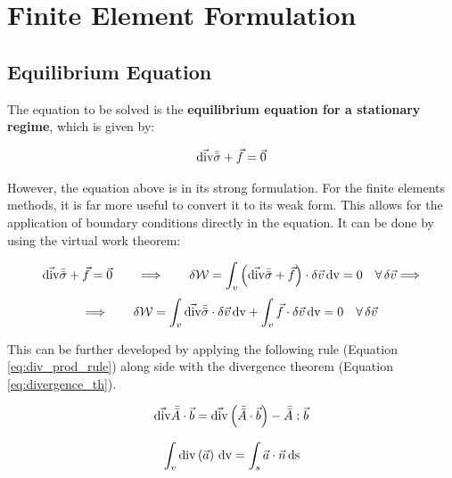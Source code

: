 \chapter{Finite Element Formulation}

\section{Equilibrium Equation}

The equation to be solved is the \textbf{equilibrium equation for a stationary regime}, which is given by:

\begin{equation}
    \vec{\mathrm{div}} \bar{\bar{\sigma}} + \vec{f} = \vec{0}
\end{equation}

However, the equation above is in its strong formulation. For the finite elements methods, it is far more useful to convert it to its weak form. This allows for the application of boundary conditions directly in the equation. It can be done by using the virtual work theorem:

\begin{equation*}
    \vec{\mathrm{div}} \bar{\bar{\sigma}} + \vec{f} = \vec{0} \qquad \Longrightarrow \qquad 
    \delta \mathcal{W} = \int_v \left( \vec{\mathrm{div}} \bar{\bar{\sigma}} + \vec{f} \right) \cdot \delta \vec{v} \, \mathrm{dv} = 0 \quad \forall \, \delta \vec{v} \Longrightarrow
\end{equation*}
\begin{equation*}
    \Longrightarrow \qquad \delta \mathcal{W} = \int_v \vec{\mathrm{div}} \bar{\bar{\sigma}} \cdot \delta \vec{v} \, \mathrm{dv} + \int_v \vec{f} \cdot \delta \vec{v} \, \mathrm{dv} = 0 \quad \forall \, \delta \vec{v}
\end{equation*}

This can be further developed by applying the following rule (Equation \ref{eq:div_prod_rule}) along side with the divergence theorem (Equation \ref{eq:divergence_th}).

\begin{equation} \label{eq:div_prod_rule}
    \vec{\mathrm{div}} \bar{\bar{A}} \cdot \vec{b} = \vec{\mathrm{div}} \left( \bar{\bar{A}} \cdot \vec{b} \right) - \bar{\bar{A}} : \vec{b}
\end{equation}

\begin{equation} \label{eq:divergence_th}
    \int_v \mathrm{div} \left(\vec{a} \right) \, \mathrm{dv} = \int_s \vec{a} \cdot \vec{n} \, \mathrm{ds}
\end{equation}

